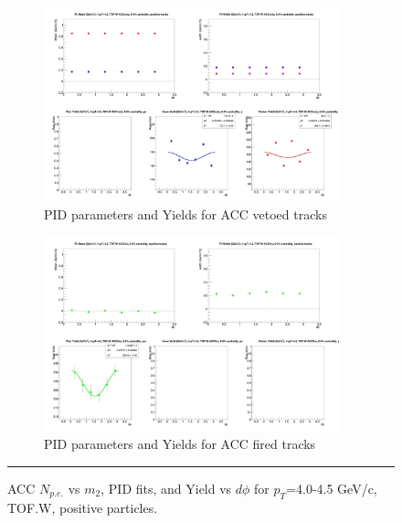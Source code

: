 \begin{figure}[H]
  \ContinuedFloat
    \begin{subfigure}{1\textwidth}
   \centering
   \includegraphics[width=0.94\textwidth]{hiptfits/pos/fitParams_tof2_cent0_ch1_pT-40-45.jpg}
    \caption{PID parameters and Yields for ACC vetoed tracks}
    \end{subfigure}    
    \begin{subfigure}{1\textwidth}
   \centering
   \includegraphics[width=0.94\textwidth]{hiptfits/pos/fitParams_tof3_cent0_ch1_pT-40-45.jpg}
    \caption{PID parameters and Yields for ACC fired tracks}
    \end{subfigure} 
    \rule{35em}{0.5pt}
  \caption[ACC $N_{p.e.}$ vs $m_2$, PID fits, and Yield vs $d\phi$ for $p_T$=4.0-4.5 GeV/c, TOF.W, positive particles.]{ACC $N_{p.e.}$ vs $m_2$, PID fits, and Yield vs $d\phi$ for $p_T$=4.0-4.5 GeV/c, TOF.W, positive particles.}
  \label{fig:acc40-45pos}
\end{figure}
